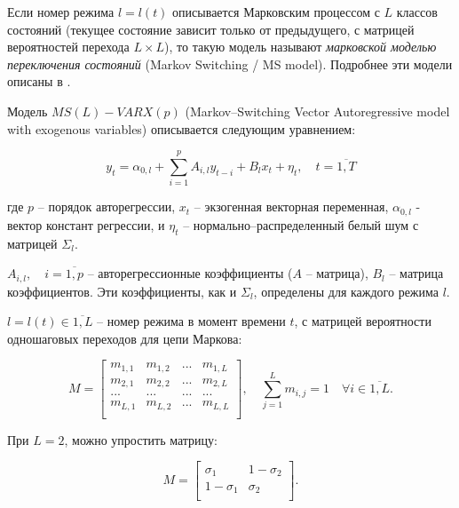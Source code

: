 \documentclass[a4paper,14pt]{extreport}
\begin{document}
	Если номер режима $l = l(t)$ описывается Марковским процессом с $L$ классов состояний (текущее состояние зависит только от предыдущего, с матрицей вероятностей перехода $L \times L$), то такую модель называют \textit{марковской моделью переключения состояний} (Markov Switching / MS model). Подробнее эти модели описаны в \cite{malNovopMSVARX,mal_methods_nonconstant}.
	
	Модель $MS(L)-VARX(p)$ (Markov--Switching Vector Autoregressive model with exogenous variables) описывается следующим уравнением:
	
	\begin{equation}
		y_{t} = \alpha_{0,l} + \sum_{i=1}^{p} A_{i,l} y_{t-i} + B_{l} x_{t} + \eta_{t}, 
		\quad t = \overline{1,T}
		\label{eq:var_equation}
	\end{equation}
	
	где $p$ -- порядок авторегрессии, $x_{t}$ -- экзогенная векторная переменная, $\alpha_{0,l}$ - вектор констант регрессии, и $\eta_{t}$ -- нормально--распределенный белый шум с матрицей $\Sigma_{l}$.
	
	$A_{i,l}, \quad i = \overline{1,p} $ -- авторегрессионные коэффициенты ($A$ -- матрица), $B_{l}$ -- матрица коэффициентов. Эти коэффициенты, как и $\Sigma_{l}$, определены для каждого режима $l$.
	
	$l=l(t) \in \overline{1,L}$ -- номер режима в момент времени $t$, с матрицей вероятности одношаговых переходов для цепи Маркова:
	
	\begin{equation}
		M=
		\left[ {\begin{array}{cccc}
			m_{1,1} & m_{1,2} & ... & m_{1,L} \\
			m_{2,1} & m_{2,2} & ... & m_{2,L} \\
			... & ... & ... & ... \\
			m_{L,1} & m_{L,2} & ... & m_{L,L} \\
			\end{array} } \right]
		, \quad
		\sum_{j=1}^{L} m_{i,j} = 1 \quad \forall i \in \overline{1,L}.
		\label{eq:M_matrix}
	\end{equation}
	
	При $L=2$, можно упростить матрицу:
	
	\begin{equation}
	M=
	\left[ {\begin{array}{cc}
		\sigma_{1} & 1-\sigma_{2} \\
		1-\sigma_{1} & \sigma_{2} \\
		\end{array} } \right].
	\label{eq:M_simplified}
	\end{equation}
	
\end{document}

